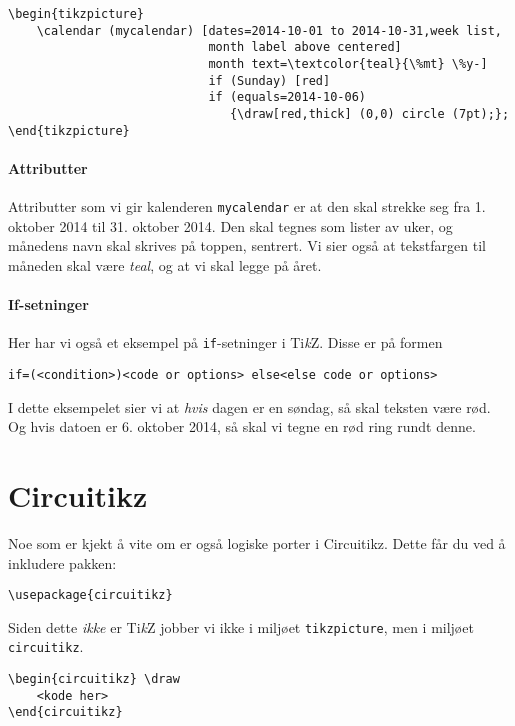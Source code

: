 \documentclass[11pt, a4paper]{article}
\newcommand{\TikZ}{Ti\textit{k}Z\xspace}
\begin{document}
\begin{Verbatim}[fontsize=\footnotesize, frame=single]
\begin{tikzpicture}
    \calendar (mycalendar) [dates=2014-10-01 to 2014-10-31,week list, 
                            month label above centered]
                            month text=\textcolor{teal}{\%mt} \%y-] 
                            if (Sunday) [red]
                            if (equals=2014-10-06) 
                               {\draw[red,thick] (0,0) circle (7pt);};
\end{tikzpicture}
\end{Verbatim}

\paragraph{Attributter} Attributter som vi gir kalenderen \texttt{mycalendar} er at den skal strekke seg fra 1. oktober 2014 til 31. oktober 2014. Den skal tegnes som lister av uker, og månedens navn skal skrives på toppen, sentrert. Vi sier også at tekstfargen til måneden skal være \textit{teal}, og at vi skal legge på året.

\paragraph{If-setninger} Her har vi også et eksempel på \texttt{if}-setninger i \TikZ. Disse er på formen
\begin{Verbatim}[fontsize=\footnotesize, frame=single]
if=(<condition>)<code or options> else<else code or options>
\end{Verbatim}

I dette eksempelet sier vi at \textit{hvis} dagen er en søndag, så skal teksten være rød. Og hvis datoen er 6. oktober 2014, så skal vi tegne en rød ring rundt denne.


\newpage

\section{Circuitikz}
Noe som er kjekt å vite om er også logiske porter i Circuitikz. Dette får du ved å inkludere pakken:
\begin{Verbatim}[fontsize=\small]
\usepackage{circuitikz}
\end{Verbatim}
Siden dette \textit{ikke} er \TikZ jobber vi ikke i miljøet \texttt{tikzpicture}, men i miljøet \texttt{circuitikz}.

\begin{Verbatim}[fontsize=\small, frame=single]
\begin{circuitikz} \draw
    <kode her>
\end{circuitikz}
\end{Verbatim}
\end{document}
